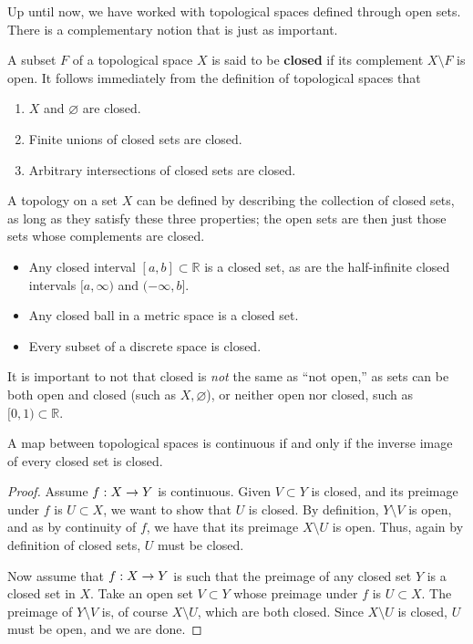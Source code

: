 \documentclass{mathnotes}
\begin{document}
Up until now, we have worked with topological spaces defined through open sets. There is a complementary notion that is just
as important.

\begin{defn}
    A subset $F$ of a topological space $X$ is said to be \textbf{closed} if its complement $X\setminus F$ is open.
    It follows immediately from the definition of topological spaces that
    \begin{enumerate}
        \item $X$ and $\varnothing$ are closed.
        \item Finite unions of closed sets are closed.
        \item Arbitrary intersections of closed sets are closed.
    \end{enumerate}
    A topology on a set $X$ can be defined by describing the collection of closed sets, as long as they satisfy these three
    properties; the open sets are then just those sets whose complements are closed.
\end{defn}

\begin{exmp}
    \hspace{1mm}
    \begin{itemize}
        \item Any closed interval $[a, b]\subset \mathbb{R}$ is a closed set, as are the half-infinite closed intervals
            $[a,\infty)$ and $(-\infty, b]$.
        \item Any closed ball in a metric space is a closed set.
        \item Every subset of a discrete space is closed.
    \end{itemize}
\end{exmp}

It is important to not that closed is \textit{not} the same as ``not open,'' as sets can be both open and closed
(such as $X, \varnothing$), or neither open nor closed, such as $[0,1)\subset\mathbb{R}$.

\begin{lem}
    A map between topological spaces is continuous if and only if the inverse image of every closed set is closed.
\end{lem}
\begin{proof}
    Assume $f:X\rightarrow Y$ is continuous. Given $V\subset Y$ is closed, and its preimage under $f$ is $U\subset X$, we want to show
    that $U$ is closed. By definition, $Y\setminus V$ is open, and as by continuity of $f$, we have that its preimage $X\setminus U$
    is open. Thus, again by definition of closed sets, $U$ must be closed.

    Now assume that $f:X\rightarrow Y$ is such that the preimage of any closed set $Y$ is a closed set in $X$. Take an open set $V\subset Y$ whose
    preimage under $f$ is $U\subset X$. The preimage of $Y\setminus V$ is, of course $X\setminus U$, which are both closed. Since
    $X\setminus U$ is closed, $U$ must be open, and we are done.
\end{proof}
\end{document}
